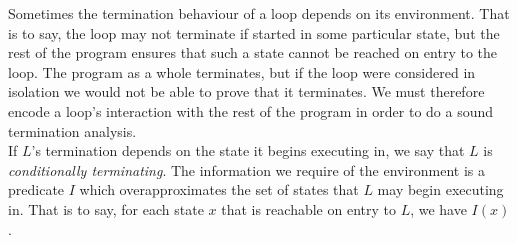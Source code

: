 \documentclass[preprint]{sigplanconf}
\theoremstyle{definition}
\newtheorem{definition}[theorem]{Definition}
\begin{document}
\begin{figure*}
\begin{framed}
 \end{framed}

\end{figure*}

Sometimes the termination behaviour of a loop depends on its environment.  That is to say,
the loop may not terminate if started in some particular state, but the rest of the program
ensures that such a state cannot be reached on entry to the loop.  The program as a whole
terminates, but if the loop were considered in isolation we would not be able to prove that
it terminates.  We must therefore encode a loop's interaction with the rest of
the program in order to do a sound termination analysis.\\

\iffalse
Let us assume that we have done some preprocessing of our program which has identified
loops, straight line code blocks and the control flow between these.  In particular,
the control flow analysis has determined which order these code blocks execute in,
and the nesting structure of the loops.
\fi

If $L$'s termination depends on the state it begins
executing in, we say that $L$ is \emph{conditionally terminating}.
The information we require of the environment is a predicate $I$ which
overapproximates the set of states that $L$ may begin executing in.
That is to say, for each state $x$ that is reachable on entry to $L$,
we have $I(x)$.
\end{document}
